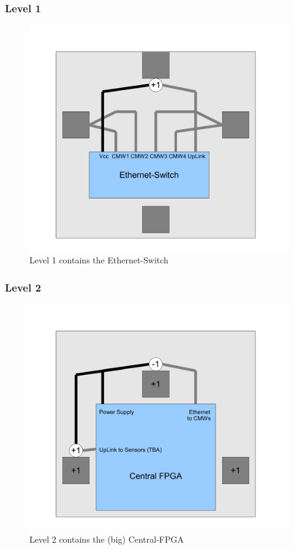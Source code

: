 \documentclass{beamer}
\begin{document}
\begin{frame}
	\frametitle{Level 1}
	\begin{figure}
	\includegraphics[scale=0.4]{figures/level1.pdf}
	\caption{Level 1 contains the Ethernet-Switch}
	\end{figure}
\end{frame}

\begin{frame}
	\frametitle{Level 2}
	\begin{figure}
	\includegraphics[scale=0.4]{figures/level2.pdf}
	\caption{Level 2 contains the (big) Central-FPGA}
	\end{figure}
\end{frame}
\end{document}
